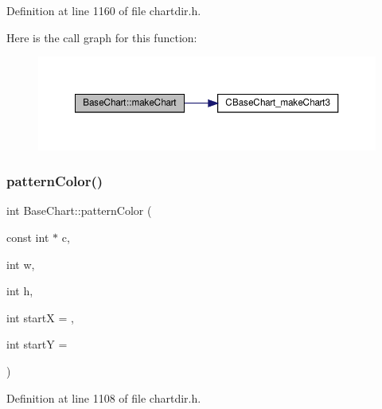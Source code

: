Definition at line 1160 of file chartdir.\+h.

Here is the call graph for this function\+:
\nopagebreak
\begin{figure}[H]
\begin{center}
\leavevmode
\includegraphics[width=350pt]{class_base_chart_a72d9fdf1ba817ccc84e874c36317f5e7_cgraph}
\end{center}
\end{figure}
\mbox{\label{class_base_chart_a509ee8041116d1a149494d1ca286f945}} 
\subsubsection{\texorpdfstring{pattern\+Color()}{patternColor()}\hspace{0.1cm}{\footnotesize\ttfamily [1/3]}}
{\footnotesize\ttfamily int Base\+Chart\+::pattern\+Color (\begin{DoxyParamCaption}\item[{const int $\ast$}]{c,  }\item[{int}]{w,  }\item[{int}]{h,  }\item[{int}]{startX = {},  }\item[{int}]{startY = {} }\end{DoxyParamCaption})\hspace{0.3cm}{\ttfamily [inline]}}



Definition at line 1108 of file chartdir.\+h.

\mbox{\label{class_base_chart_a6b6bea43b51896c82d83778a614f5d99}} 
